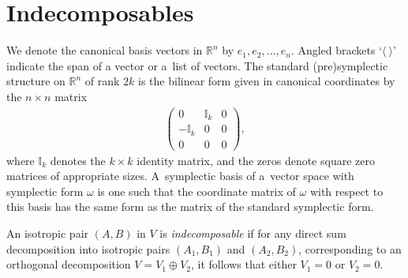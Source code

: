 \documentclass[pdftex]{sigma}
\numberwithin{equation}{section}
\begin{document}
\section{Indecomposables}\label{indecomposables}

We denote the canonical basis vectors in $\mathbb{R}^n$ by $e_1, e_2, \dots , e_n$. Angled brackets `{$\langle \  \rangle$}' indicate the span of a vector or a~list of vectors. The standard (pre)symplectic structure on $\mathbb{R}^n$ of rank $2k$ is the bilinear form given in canonical coordinates by the $n \times n$ matrix
\begin{gather*}
\left(
\begin{matrix}
0 & \mathbb{I}_k & 0  \\
-\mathbb{I}_k & 0 & 0  \\
0 & 0 & 0
\end{matrix}
\right),
\end{gather*}
where $\mathbb{I}_k$ denotes the $k \times k$ identity matrix, and the zeros denote square zero matrices of appropriate sizes. A~symplectic basis of a~vector space with symplectic form $\omega$ is one such that the coordinate matrix of $\omega$ with respect to this basis has the same form as the matrix of the standard symplectic form.

\begin{Definition}\label{indecomposable}
An isotropic pair $(A,B)$ in $V$ is \textit{indecomposable} if for any direct sum decomposition into isotropic pairs $(A_1,B_1)$ and $(A_2,B_2)$, corresponding to an orthogonal decomposition $V=V_1 \oplus V_2$, it follows that either $V_1 = 0$ or $V_2 = 0$.
\end{Definition}
\end{document}
